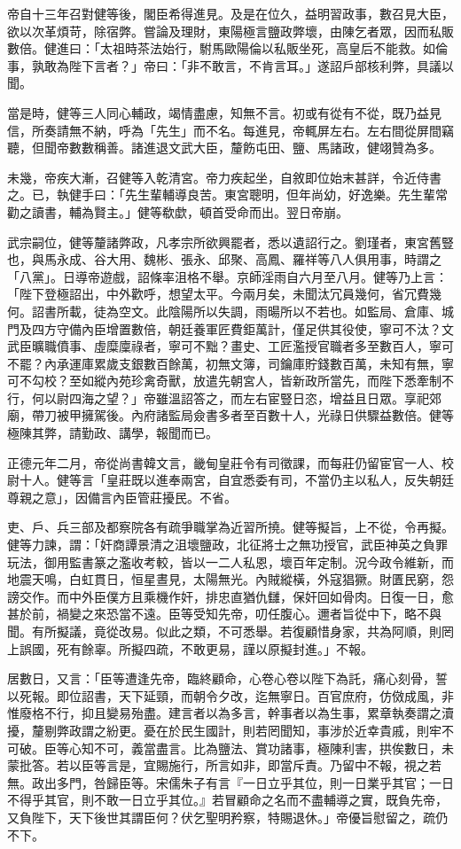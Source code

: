 \begin{pinyinscope}
帝自十三年召對健等後，閣臣希得進見。及是在位久，益明習政事，數召見大臣，欲以次革煩苛，除宿弊。嘗論及理財，東陽極言鹽政弊壞，由陳乞者眾，因而私販數倍。健進曰：「太祖時茶法始行，駙馬歐陽倫以私販坐死，高皇后不能救。如倫事，孰敢為陛下言者？」帝曰：「非不敢言，不肯言耳。」遂詔戶部核利弊，具議以聞。

當是時，健等三人同心輔政，竭情盡慮，知無不言。初或有從有不從，既乃益見信，所奏請無不納，呼為「先生」而不名。每進見，帝輒屏左右。左右間從屏間竊聽，但聞帝數數稱善。諸進退文武大臣，釐飭屯田、鹽、馬諸政，健翊贊為多。

未幾，帝疾大漸，召健等入乾清宮。帝力疾起坐，自敘即位始末甚詳，令近侍書之。已，執健手曰：「先生輩輔導良苦。東宮聰明，但年尚幼，好逸樂。先生輩常勸之讀書，輔為賢主。」健等欷歔，頓首受命而出。翌日帝崩。

武宗嗣位，健等釐諸弊政，凡孝宗所欲興罷者，悉以遺詔行之。劉瑾者，東宮舊豎也，與馬永成、谷大用、魏彬、張永、邱聚、高鳳、羅祥等八人俱用事，時謂之「八黨」。日導帝遊戲，詔條率沮格不舉。京師淫雨自六月至八月。健等乃上言：「陛下登極詔出，中外歡呼，想望太平。今兩月矣，未聞汰冗員幾何，省冗費幾何。詔書所載，徒為空文。此陰陽所以失調，雨暘所以不若也。如監局、倉庫、城門及四方守備內臣增置數倍，朝廷養軍匠費鉅萬計，僅足供其役使，寧可不汰？文武臣曠職僨事、虛糜廩祿者，寧可不黜？畫史、工匠濫授官職者多至數百人，寧可不罷？內承運庫累歲支銀數百餘萬，初無文簿，司鑰庫貯錢數百萬，未知有無，寧可不勾校？至如縱內苑珍禽奇獸，放遣先朝宮人，皆新政所當先，而陛下悉牽制不行，何以尉四海之望？」帝雖溫詔答之，而左右宦豎日恣，增益且日眾。享祀郊廟，帶刀被甲擁駕後。內府諸監局僉書多者至百數十人，光祿日供驟益數倍。健等極陳其弊，請勤政、講學，報聞而已。

正德元年二月，帝從尚書韓文言，畿甸皇莊令有司徵課，而每莊仍留宦官一人、校尉十人。健等言「皇莊既以進奉兩宮，自宜悉委有司，不當仍主以私人，反失朝廷尊親之意」，因備言內臣管莊擾民。不省。

吏、戶、兵三部及都察院各有疏爭職掌為近習所撓。健等擬旨，上不從，令再擬。健等力諫，謂：「奸商譚景清之沮壞鹽政，北征將士之無功授官，武臣神英之負罪玩法，御用監書篆之濫收考較，皆以一二人私恩，壞百年定制。況今政令維新，而地震天鳴，白虹貫日，恒星晝見，太陽無光。內賊縱橫，外寇猖獗。財匱民窮，怨謗交作。而中外臣僕方且乘機作奸，排忠直猶仇讎，保奸回如骨肉。日復一日，愈甚於前，禍變之來恐當不遠。臣等受知先帝，叨任腹心。邇者旨從中下，略不與聞。有所擬議，竟從改易。似此之類，不可悉舉。若復顧惜身家，共為阿順，則罔上誤國，死有餘辜。所擬四疏，不敢更易，謹以原擬封進。」不報。

居數日，又言：「臣等遭逢先帝，臨終顧命，心卷心卷以陛下為託，痛心刻骨，誓以死報。即位詔書，天下延頸，而朝令夕改，迄無寧日。百官庶府，仿傚成風，非惟廢格不行，抑且變易殆盡。建言者以為多言，幹事者以為生事，累章執奏謂之瀆擾，釐剔弊政謂之紛更。憂在於民生國計，則若罔聞知，事涉於近幸貴戚，則牢不可破。臣等心知不可，義當盡言。比為鹽法、賞功諸事，極陳利害，拱俟數日，未蒙批答。若以臣等言是，宜賜施行，所言如非，即當斥責。乃留中不報，視之若無。政出多門，咎歸臣等。宋儒朱子有言『一日立乎其位，則一日業乎其官；一日不得乎其官，則不敢一日立乎其位。』若冒顧命之名而不盡輔導之實，既負先帝，又負陛下，天下後世其謂臣何？伏乞聖明矜察，特賜退休。」帝優旨慰留之，疏仍不下。


\end{pinyinscope}
